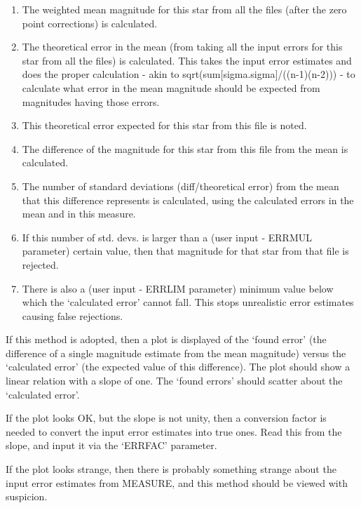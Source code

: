{{\begin{list}{{---}}{}
      \begin{enumerate}
      \item The weighted mean magnitude for this star from all the files 
         (after the zero point corrections) is calculated.
      \item The theoretical error in the mean (from taking all the input 
         errors for this star from all the files) is calculated. This
         takes the input error estimates and does the proper 
         calculation - akin to sqrt(sum[sigma.sigma]/((n-1)(n-2))) - to 
         calculate what error in the mean magnitude should be expected
         from magnitudes having those errors.
      \item This theoretical error expected for this star from this file 
         is noted.
      \item The difference of the magnitude for this star from this file 
         from the mean is calculated.
      \item The number of standard deviations (diff/theoretical error) 
         from the mean that this difference represents is calculated, 
         using the calculated errors in the mean and in this measure.
      \item If this number of std. devs. is larger than a (user input - 
         ERRMUL parameter) certain value, then that magnitude for that 
         star from that file is rejected.
      \item There is also a (user input - ERRLIM parameter) minimum value 
         below which the `calculated error' cannot fall. This stops 
         unrealistic error estimates causing false rejections.
      \end{enumerate}

      If this method is adopted, then a plot is displayed of the `found 
      error' (the difference of a single magnitude estimate from the 
      mean magnitude) versus the `calculated error' (the expected 
      value of this difference). The plot should show a linear 
      relation with a slope of one. The `found errors' should scatter 
      about the `calculated error'. 

      If the plot looks OK, but the slope is not unity, then a 
      conversion factor is needed to convert the input error estimates 
      into true ones. Read this from the slope, and input it via the
      `ERRFAC' parameter.
               
      If the plot looks strange, then there is probably something 
      strange about the input error estimates from MEASURE, and this 
      method should be viewed with suspicion.


\end{list}}}
